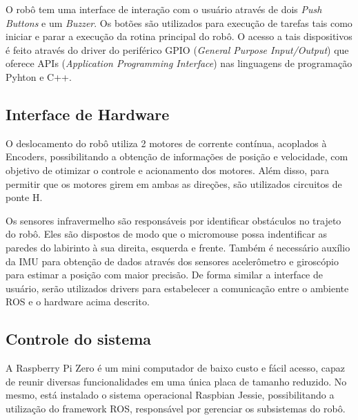 O robô tem uma interface de interação com o usuário através de dois \textit{Push Buttons} e um \textit{Buzzer}. Os botões são utilizados para execução de tarefas tais como iniciar  e parar a execução da rotina principal do robô. O acesso a tais dispositivos é feito através do driver do periférico GPIO (\textit{General Purpose Input/Output}) que oferece APIs (\textit{Application Programming Interface}) nas linguagens de programação Pyhton e C++.

\subsection{Interface de Hardware}
\label{ssec:interface_de_hardware}
O deslocamento do robô utiliza 2 motores de corrente contínua, acoplados à Encoders, possibilitando a obtenção de informações de posição e velocidade, com objetivo de otimizar o controle e acionamento dos motores. Além disso, para permitir que os motores girem em ambas as direções, são utilizados circuitos de ponte H.
 
Os sensores infravermelho são responsáveis por identificar obstáculos no trajeto do robô. Eles são dispostos de modo que o micromouse possa indentificar as paredes do labirinto à sua direita, esquerda e frente. Também é necessário auxílio da IMU para obtenção de dados através dos sensores acelerômetro e giroscópio para estimar a posição com maior precisão. De forma similar a interface de usuário, serão utilizados drivers para estabelecer a comunicação entre o ambiente ROS e o hardware acima descrito.

\subsection{Controle do sistema}
\label{ssec:controle_do_sistema}
A Raspberry Pi Zero é um mini computador de baixo custo e fácil acesso, capaz de reunir diversas funcionalidades em uma única placa de tamanho reduzido.  No mesmo, está instalado o sistema operacional Raspbian Jessie, possibilitando a utilização do framework ROS, responsável por gerenciar os subsistemas do robô.

